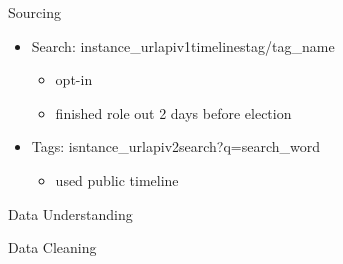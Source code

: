 \documentclass[usenames,dvipsnames,aspectratio=169]{beamer}
\begin{document}
	\begin{frame}{Sourcing}
		
		\begin{itemize}
			\item Search: {{instance\_url}}\/api\/v1\/timelines\/tag/{{tag\_name}}
			\begin{itemize}
				\item opt-in
				\item finished role out 2 days before election
			\end{itemize}
			\item Tags: {{isntance\_url}}\/api\/v2\/search?q={{search\_word}}
			\begin{itemize}
				\item used public timeline
			\end{itemize}
			
		\end{itemize}
	\end{frame}
	
	\begin{frame}{Data Understanding}
	\end{frame}
	
	\begin{frame}{Data Cleaning}
		\begin{columns}
			
			\begin{column}{0.45\textwidth}
				\begin{tcolorbox}[colback=white, colframe=ElixirPurple, arc=3mm, boxrule=0mm, height=0.8\textheight, valign=center, title=Text Cleaning]
				\end{tcolorbox}
			\end{column}
			
			\begin{column}{0.45\textwidth}
				\begin{tcolorbox}[colback=white, colframe=ElixirPurple, arc=3mm, boxrule=0mm, height=0.8\textheight, valign=center, title=Post Selection]
					
					
				\end{tcolorbox}
			\end{column}
		\end{columns}
	\end{frame}
	
\end{document}

